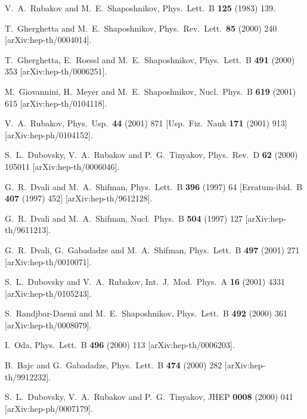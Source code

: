 \documentclass[a4paper,12pt]{article}
\begin{document}
\begin{thebibliography}{99}
V.~A.~Rubakov and M.~E.~Shaposhnikov,
Phys.\ Lett.\ B {\bf 125} (1983) 139.

T.~Gherghetta and M.~E.~Shaposhnikov,
Phys.\ Rev.\ Lett.\  {\bf 85} (2000) 240
[arXiv:hep-th/0004014].

T.~Gherghetta, E.~Roessl and M.~E.~Shaposhnikov,
Phys.\ Lett.\ B {\bf 491} (2000) 353
[arXiv:hep-th/0006251].

M.~Giovannini, H.~Meyer and M.~E.~Shaposhnikov,
Nucl.\ Phys.\ B {\bf 619} (2001) 615
[arXiv:hep-th/0104118].

V.~A.~Rubakov,
Phys.\ Usp.\  {\bf 44} (2001) 871
[Usp.\ Fiz.\ Nauk {\bf 171} (2001) 913]
[arXiv:hep-ph/0104152].

S.~L.~Dubovsky, V.~A.~Rubakov and P.~G.~Tinyakov,
Phys.\ Rev.\ D {\bf 62} (2000) 105011
[arXiv:hep-th/0006046].

G.~R.~Dvali and M.~A.~Shifman,
Phys.\ Lett.\ B {\bf 396} (1997) 64
[Erratum-ibid.\ B {\bf 407} (1997) 452]
[arXiv:hep-th/9612128].

G.~R.~Dvali and M.~A.~Shifman,
Nucl.\ Phys.\ B {\bf 504} (1997) 127
[arXiv:hep-th/9611213].

G.~R.~Dvali, G.~Gabadadze and M.~A.~Shifman,
Phys.\ Lett.\ B {\bf 497} (2001) 271
[arXiv:hep-th/0010071].

S.~L.~Dubovsky and V.~A.~Rubakov,
Int.\ J.\ Mod.\ Phys.\ A {\bf 16} (2001) 4331
[arXiv:hep-th/0105243].

S.~Randjbar-Daemi and M.~E.~Shaposhnikov,
Phys.\ Lett.\ B {\bf 492} (2000) 361
[arXiv:hep-th/0008079].

I.~Oda,
Phys.\ Lett.\ B {\bf 496} (2000) 113
[arXiv:hep-th/0006203].

B.~Bajc and G.~Gabadadze,
Phys.\ Lett.\ B {\bf 474} (2000) 282
[arXiv:hep-th/9912232].

S.~L.~Dubovsky, V.~A.~Rubakov and P.~G.~Tinyakov,
JHEP {\bf 0008} (2000) 041
[arXiv:hep-ph/0007179].


\end{thebibliography}
\end{document}
